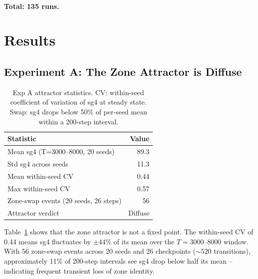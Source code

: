 \documentclass[11pt,a4paper]{article}
\begin{document}
\paragraph{Total: 135 runs.}

\section{Results}
\label{sec:results}

\subsection{Experiment A: The Zone Attractor is Diffuse}

\begin{table}[h]
\centering
\caption{Exp A attractor statistics.  CV: within-seed coefficient of variation of sg4 at
steady state.  Swap: sg4 drops below 50\% of per-seed mean within a 200-step interval.}
\label{tab:expA}
\begin{tabular}{l|r}
\toprule
Statistic & Value \\
\midrule
Mean sg4 (T=3000--8000, 20 seeds)  & 89.3 \\
Std sg4 across seeds               & 11.3 \\
Mean within-seed CV                & 0.44 \\
Max  within-seed CV                & 0.57 \\
Zone-swap events (20 seeds, 26 steps) & 56 \\
Attractor verdict                  & Diffuse \\
\bottomrule
\end{tabular}
\end{table}

Table~\ref{tab:expA} shows that the zone attractor is not a fixed point.  The
within-seed CV of 0.44 means sg4 fluctuates by $\pm 44\%$ of its mean over the
$T=3000$--$8000$ window.  With 56 zone-swap events across 20 seeds and 26 checkpoints
($\sim 520$ transitions), approximately 11\% of 200-step intervals see sg4 drop below
half its mean -- indicating frequent transient loss of zone identity.
\end{document}
